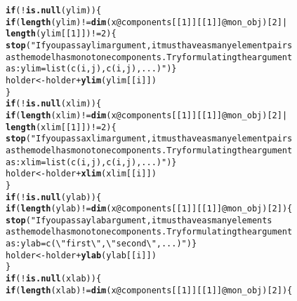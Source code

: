 \documentclass[10pt]{olplainarticle}\usepackage[]{graphicx}\usepackage[]{color}
\makeatletter
\newcommand{\hlnum}[1]{\textcolor[rgb]{0.686,0.059,0.569}{#1}}%
\newcommand{\hlstr}[1]{\textcolor[rgb]{0.192,0.494,0.8}{#1}}%
\newcommand{\hlopt}[1]{\textcolor[rgb]{0,0,0}{#1}}%
\newcommand{\hlstd}[1]{\textcolor[rgb]{0.345,0.345,0.345}{#1}}%
\newcommand{\hlkwa}[1]{\textcolor[rgb]{0.161,0.373,0.58}{\textbf{#1}}}%
\newcommand{\hlkwb}[1]{\textcolor[rgb]{0.69,0.353,0.396}{#1}}%
\newcommand{\hlkwc}[1]{\textcolor[rgb]{0.333,0.667,0.333}{#1}}%
\newcommand{\hlkwd}[1]{\textcolor[rgb]{0.737,0.353,0.396}{\textbf{#1}}}%
\newenvironment{kframe}{%
 \def\at@end@of@kframe{}%
 \ifinner\ifhmode%
  \def\at@end@of@kframe{\end{minipage}}%
  \begin{minipage}{\columnwidth}%
 \fi\fi%
 \def\FrameCommand##1{\hskip\@totalleftmargin \hskip-\fboxsep
 \colorbox{shadecolor}{##1}\hskip-\fboxsep
     \hskip-\linewidth \hskip-\@totalleftmargin \hskip\columnwidth}%
 \MakeFramed {\advance\hsize-\width
   \@totalleftmargin\z@ \linewidth\hsize
   \@setminipage}}%
 {\par\unskip\endMakeFramed%
 \at@end@of@kframe}
\newenvironment{knitrout}{}{} %
\makeatother
\begin{document}
\begin{appendices}
\begin{knitrout}
\begin{kframe}
\begin{alltt}
                \hlkwa{if}\hlstd{(}\hlopt{!}\hlkwd{is.null}\hlstd{(ylim))\{}
                  \hlkwa{if}\hlstd{(}\hlkwd{length}\hlstd{(ylim)} \hlopt{!=} \hlkwd{dim}\hlstd{( x}\hlopt{@}\hlkwc{components}\hlstd{[[}\hlnum{1}\hlstd{]][[}\hlnum{1}\hlstd{]]}\hlopt{@}\hlkwc{mon_obj} \hlstd{)[}\hlnum{2}\hlstd{]} \hlopt{|}
                     \hlkwd{length}\hlstd{(ylim[[}\hlnum{1}\hlstd{]])} \hlopt{!=} \hlnum{2} \hlstd{)\{}
                    \hlkwd{stop}\hlstd{(}\hlstr{"If you pass a ylim argument, it must have as many element pairs 
                         as the model has monotone components. Try formulating the argument
                         as: ylim = list(c(i,j), c(i,j), ...)"}\hlstd{)\}}
                  \hlstd{holder} \hlkwb{<-} \hlstd{holder} \hlopt{+} \hlkwd{ylim}\hlstd{(ylim[[i]])}
                \hlstd{\}}
                \hlkwa{if}\hlstd{(}\hlopt{!}\hlkwd{is.null}\hlstd{(xlim))\{}
                  \hlkwa{if}\hlstd{(}\hlkwd{length}\hlstd{(xlim)} \hlopt{!=} \hlkwd{dim}\hlstd{( x}\hlopt{@}\hlkwc{components}\hlstd{[[}\hlnum{1}\hlstd{]][[}\hlnum{1}\hlstd{]]}\hlopt{@}\hlkwc{mon_obj} \hlstd{)[}\hlnum{2}\hlstd{]} \hlopt{|}
                     \hlkwd{length}\hlstd{(xlim[[}\hlnum{1}\hlstd{]])} \hlopt{!=} \hlnum{2} \hlstd{)\{}
                    \hlkwd{stop}\hlstd{(}\hlstr{"If you pass a xlim argument, it must have as many element pairs 
                         as the model has monotone components. Try formulating the argument
                         as: xlim = list(c(i,j), c(i,j), ...)"}\hlstd{)\}}
                  \hlstd{holder} \hlkwb{<-} \hlstd{holder} \hlopt{+} \hlkwd{xlim}\hlstd{(xlim[[i]])}
                \hlstd{\}}
                \hlkwa{if}\hlstd{(}\hlopt{!}\hlkwd{is.null}\hlstd{(ylab))\{}
                  \hlkwa{if}\hlstd{(}\hlkwd{length}\hlstd{(ylab)} \hlopt{!=} \hlkwd{dim}\hlstd{( x}\hlopt{@}\hlkwc{components}\hlstd{[[}\hlnum{1}\hlstd{]][[}\hlnum{1}\hlstd{]]}\hlopt{@}\hlkwc{mon_obj} \hlstd{)[}\hlnum{2}\hlstd{])\{}
                    \hlkwd{stop}\hlstd{(}\hlstr{"If you pass a ylab argument, it must have as many elements 
                         as the model has monotone components. Try formulating the argument
                         as: ylab = c(\textbackslash{}"first\textbackslash{}",\textbackslash{}"second\textbackslash{}",...)"}\hlstd{)\}}
                  \hlstd{holder} \hlkwb{<-} \hlstd{holder} \hlopt{+} \hlkwd{ylab}\hlstd{(ylab[[i]])}
                \hlstd{\}}
                \hlkwa{if}\hlstd{(}\hlopt{!}\hlkwd{is.null}\hlstd{(xlab))\{}
                  \hlkwa{if}\hlstd{(}\hlkwd{length}\hlstd{(xlab)} \hlopt{!=} \hlkwd{dim}\hlstd{( x}\hlopt{@}\hlkwc{components}\hlstd{[[}\hlnum{1}\hlstd{]][[}\hlnum{1}\hlstd{]]}\hlopt{@}\hlkwc{mon_obj} \hlstd{)[}\hlnum{2}\hlstd{])\{}

\end{alltt}
\end{kframe}
\end{knitrout}
\end{appendices}
\end{document}
